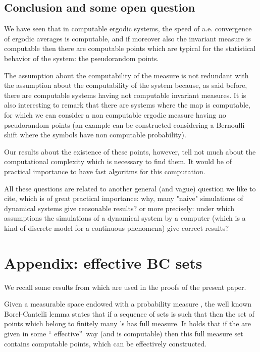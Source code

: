 \documentclass[copyright,creativecommons]{eptcs}
\numberwithin{equation}{section}
\begin{document}
\subsection{Conclusion and some open question}

We have seen that in computable ergodic systems, the speed of a.e.
convergence of ergodic averages is computable, and if moreover also the
invariant measure is computable then there are computable points which are
typical for the statistical behavior of the system: the pseudorandom points.

The assumption about the computability of the measure is not redundant with
the assumption about the computability of the system because, as said
before, there are computable systems having not computable invariant
measures. It is also interesting to remark that there 
are systems where the map  is computable, for which we can consider a non computable ergodic measure having no pseudorandom points (an example can be constructed considering a Bernoulli shift where the symbols have non computable probability).

Our results about the existence of these points, however, tell not much
about the computational complexity which is necessary to find them. It would
be of practical importance to have fast algoritms for this computation.

All these questions are related to another general (and vague) question we
like to cite, which is of great practical importance:  why, many "naive"
simulations of  dynamical systems give reasonable results? or more
precisely: under which assumptions the simulations of a dynamical system by
a computer (which is a kind of discrete model for a continuous phenomena)
give correct results?

\section{Appendix: effective BC sets}

We recall some results from \cite{GHR07} which are used in the proofs of the
present paper.

 Given a measurable space  endowed with a probability
measure , the well known Borel-Cantelli lemma states that if a
sequence of sets  is such that  then the
set of points which belong to finitely many 's has full measure. It holds that if the  are given in some \textquotedblleft
effective\textquotedblright\ way (and  is computable) then this full
measure set contains computable points, which can be effectively constructed.
\end{document}

